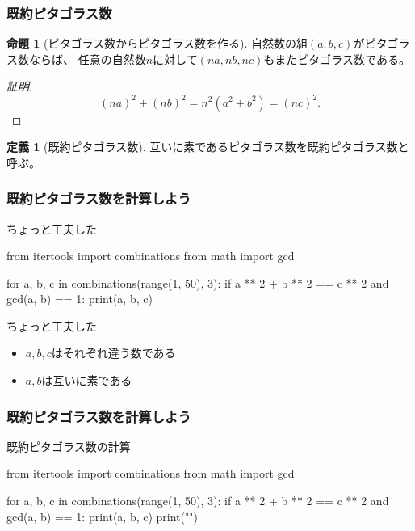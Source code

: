\documentclass[dvipdfmx,11pt,notheorems]{beamer}
\theoremstyle{definition}
\newtheorem{definition}{定義}
\newtheorem{proposition}{命題}
\begin{document}
\begin{frame}\frametitle{既約ピタゴラス数}

\begin{proposition}[ピタゴラス数からピタゴラス数を作る]
自然数の組$(a, b, c)$がピタゴラス数ならば、
任意の自然数$n$に対して$(na, nb, nc)$もまたピタゴラス数である。
\end{proposition}

\begin{proof}[証明]
\begin{equation*}
(na)^{2} + (nb)^{2} = n^{2} (a^{2} + b^{2}) = (nc)^{2}.
\end{equation*}
\end{proof}

\begin{definition}[既約ピタゴラス数]
互いに素であるピタゴラス数を既約ピタゴラス数と呼ぶ。
\end{definition}

\end{frame}

\begin{frame}[fragile]\frametitle{既約ピタゴラス数を計算しよう}

\begin{block}{ちょっと工夫した}
\begin{pyverbatim}
from itertools import combinations
from math import gcd

for a, b, c in combinations(range(1, 50), 3):
    if a ** 2 + b ** 2 == c ** 2 and gcd(a, b) == 1:
        print(a, b, c)
\end{pyverbatim}
\end{block}

\begin{block}{ちょっと工夫した}
\begin{itemize}
\item $a,b,c$はそれぞれ違う数である
\item $a,b$は互いに素である
\end{itemize}
\end{block}

\end{frame}

\begin{frame}[fragile]\frametitle{既約ピタゴラス数を計算しよう}

\begin{block}{既約ピタゴラス数の計算}
\begin{pycode}
from itertools import combinations
from math import gcd

for a, b, c in combinations(range(1, 50), 3):
    if a ** 2 + b ** 2 == c ** 2 and gcd(a, b) == 1:
        print(a, b, c)
        print("\n")
\end{pycode}
\end{block}

\end{frame}
\end{document}
